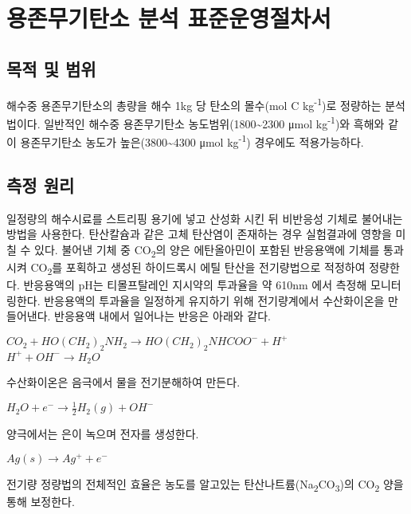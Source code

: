 \documentclass[
]{book}
\begin{document}
\hypertarget{uxc6a9uxc874uxbb34uxae30uxd0c4uxc18c-uxbd84uxc11d-uxd45cuxc900uxc6b4uxc601uxc808uxcc28uxc11c}{%
\chapter{용존무기탄소 분석 표준운영절차서}\label{uxc6a9uxc874uxbb34uxae30uxd0c4uxc18c-uxbd84uxc11d-uxd45cuxc900uxc6b4uxc601uxc808uxcc28uxc11c}}

\hypertarget{uxbaa9uxc801-uxbc0f-uxbc94uxc704-8}{%
\section{목적 및 범위}\label{uxbaa9uxc801-uxbc0f-uxbc94uxc704-8}}

해수중 용존무기탄소의 총량을 해수 1kg 당 탄소의 몰수(mol C kg\textsuperscript{-1})로 정량하는 분석법이다. 일반적인 해수중 용존무기탄소 농도범위(1800\textasciitilde2300 μmol kg\textsuperscript{-1})와 흑해와 같이 용존무기탄소 농도가 높은(3800\textasciitilde4300 μmol kg\textsuperscript{-1}) 경우에도 적용가능하다.

\hypertarget{uxce21uxc815-uxc6d0uxb9ac-6}{%
\section{측정 원리}\label{uxce21uxc815-uxc6d0uxb9ac-6}}

일정량의 해수시료를 스트리핑 용기에 넣고 산성화 시킨 뒤 비반응성 기체로 불어내는 방법을 사용한다. 탄산칼슘과 같은 고체 탄산염이 존재하는 경우 실험결과에 영향을 미칠 수 있다. 불어낸 기체 중 CO\textsubscript{2}의 양은 에탄올아민이 포함된 반응용액에 기체를 통과시켜 CO\textsubscript{2}를 포획하고 생성된 하이드록시 에틸 탄산을 전기량법으로 적정하여 정량한다. 반응용액의 pH는 티몰프탈레인 지시약의 투과율을 약 610nm 에서 측정해 모니터링한다. 반응용액의 투과율을 일정하게 유지하기 위해 전기량계에서 수산화이온을 만들어낸다. 반응용액 내에서 일어나는 반응은 아래와 같다.

\(CO_2+HO(CH_2)_2NH_2 \to HO(CH_2)_2NHCOO^-+H^+\)\\
\(H^++OH^- \to H_2O\)

수산화이온은 음극에서 물을 전기분해하여 만든다.

\(H_2O+e^- \to \frac{1}{2}H_2(g)+OH^-\)

양극에서는 은이 녹으며 전자를 생성한다.

\(Ag(s) \to Ag^++e^-\)

전기량 정량법의 전체적인 효율은 농도를 알고있는 탄산나트륨(Na\textsubscript{2}CO\textsubscript{3})의 CO\textsubscript{2} 양을 통해 보정한다.
\end{document}
